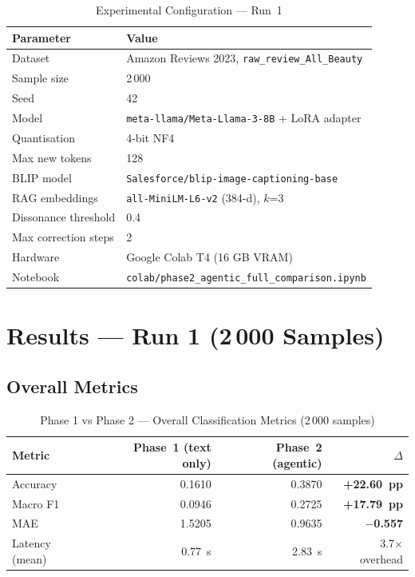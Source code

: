 \documentclass[12pt,a4paper]{article}
\begin{document}
\begin{table}[H]
\centering
\caption{Experimental Configuration --- Run~1}
\begin{tabular}{ll}
\toprule
\textbf{Parameter} & \textbf{Value} \\
\midrule
Dataset         & Amazon Reviews 2023, \texttt{raw\_review\_All\_Beauty} \\
Sample size     & 2\,000 \\
Seed            & 42 \\
Model           & \texttt{meta-llama/Meta-Llama-3-8B} + LoRA adapter \\
Quantisation    & 4-bit NF4 \\
Max new tokens  & 128 \\
BLIP model      & \texttt{Salesforce/blip-image-captioning-base} \\
RAG embeddings  & \texttt{all-MiniLM-L6-v2} (384-d), $k$=3 \\
Dissonance threshold & 0.4 \\
Max correction steps & 2 \\
Hardware        & Google Colab T4 (16 GB VRAM) \\
Notebook        & \texttt{colab/phase2\_agentic\_full\_comparison.ipynb} \\
\bottomrule
\end{tabular}
\end{table}
\newcommand{\efigdir}{figures/e23/}



\section{Results --- Run 1 (2\,000 Samples)}

\subsection{Overall Metrics}

\begin{table}[H]
\centering
\caption{Phase 1 vs Phase 2 --- Overall Classification Metrics (2\,000 samples)}
\begin{tabular}{lrrr}
\toprule
\textbf{Metric} & \textbf{Phase~1 (text only)} & \textbf{Phase~2 (agentic)} & \textbf{$\Delta$} \\
\midrule
Accuracy    & 0.1610 & 0.3870 & \textbf{+22.60~pp} \\
Macro F1    & 0.0946 & 0.2725 & \textbf{+17.79~pp} \\
MAE         & 1.5205 & 0.9635 & \textbf{$-$0.557} \\
Latency (mean) & 0.77~s & 2.83~s & 3.7$\times$ overhead \\
\bottomrule
\end{tabular}
\end{table}
\end{document}
